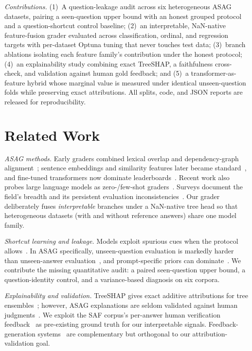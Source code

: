 \documentclass[10pt,twocolumn]{article}
\begin{document}
\textit{Contributions.} (1)~A question-leakage audit across six heterogeneous
ASAG datasets, pairing a seen-question upper bound with an honest grouped protocol
and a question-shortcut control baseline; (2)~an interpretable, NaN-native
feature-fusion grader evaluated across classification, ordinal, and regression
targets with per-dataset Optuna tuning that never touches test data; (3)~branch
ablations isolating each feature family's contribution under the honest protocol;
(4)~an explainability study combining exact TreeSHAP, a faithfulness cross-check,
and validation against human gold feedback; and (5)~a transformer-as-feature
hybrid whose marginal value is measured under identical unseen-question folds
while preserving exact attributions. All splits, code, and JSON reports are
released for reproducibility.

\section{Related Work}
\label{sec:related}
\textit{ASAG methods.} Early graders combined lexical overlap and dependency-graph
alignment~\cite{mohler2011learning,sultan2016fast}; sentence embeddings and
similarity features later became standard~\cite{reimers2019sentencebert,
putnikovic2023embeddings,bexte2022similarity}, and fine-tuned transformers now
dominate leaderboards~\cite{camus2020investigating,sung2019pretraining}. Recent
work also probes large language models as zero-/few-shot
graders~\cite{chamieh2024llms,ferreiramello2025gpt4}. Surveys document the field's
breadth and its persistent evaluation inconsistencies~\cite{burrows2015eras,
haller2022survey}. Our grader deliberately fuses \emph{interpretable} branches
under a NaN-native tree head so that heterogeneous datasets (with and without
reference answers) share one model family.

\textit{Shortcut learning and leakage.} Models exploit spurious cues when the
protocol allows~\cite{geirhos2020shortcut,ding2020dont}. In ASAG specifically,
unseen-question evaluation is markedly harder than unseen-answer
evaluation~\cite{dzikovska2013semeval,condor2021automatic}, and prompt-specific
priors can dominate~\cite{funayama2020preventing,funayama2022balancing}. We
contribute the missing quantitative audit: a paired seen-question upper bound, a
question-identity control, and a variance-based diagnosis on six corpora.

\textit{Explainability and validation.} TreeSHAP gives exact additive attributions
for tree ensembles~\cite{lundberg2017unified,lundberg2020local}; however, ASAG
explanations are seldom validated against human judgments~\cite{poulton2021explaining,
tornqvist2023exasag,delgobbo2023gradeaid}. We exploit the SAF corpus's per-answer
human verification feedback~\cite{filighera2022your} as pre-existing ground truth
for our interpretable signals. Feedback-generation systems~\cite{filighera2020fooling,
aggarwal2024engsaf} are complementary but orthogonal to our attribution-validation
goal.
\end{document}
